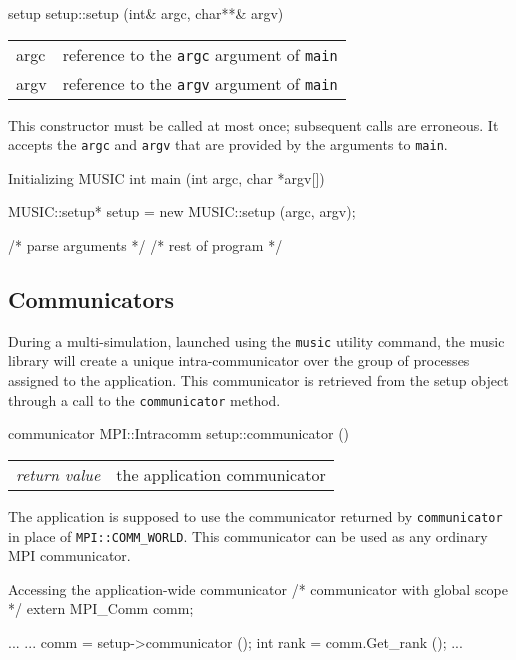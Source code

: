 \documentclass[a4paper]{report}
\begin{document}
\begin{head}{setup}
  setup::setup (int& argc, char**& argv)
\end{head}
\begin{tabular}{ll}
  argc & reference to the \verb|argc| argument of \verb|main| \\
  argv & reference to the \verb|argv| argument of \verb|main| \\
\end{tabular}

This constructor must be called at most once; subsequent calls are
erroneous.  It accepts the \verb|argc| and \verb|argv| that are
provided by the arguments to \verb|main|.

\begin{code}{Initializing MUSIC}
int main (int argc, char *argv[])
{
  MUSIC::setup* setup = new MUSIC::setup (argc, argv);

  /* parse arguments */
  /* rest of program */
}
\end{code}

\subsection{Communicators}

During a multi-simulation, launched using the \verb|music| utility
command, the music library will create a unique intra-communicator
over the group of processes assigned to the application.  This
communicator is retrieved from the setup object through a call to the
\verb|communicator| method.

\begin{head}{communicator}
  MPI::Intracomm setup::communicator ()
\end{head}
\begin{tabular}{ll}
  \emph{return value} & the application communicator \\
\end{tabular}

The application is supposed to use the communicator returned by
\verb|communicator| in place of \verb|MPI::COMM_WORLD|.  This
communicator can be used as any ordinary MPI communicator.

\begin{code}{Accessing the application-wide communicator}
/* communicator with global scope */
extern MPI_Comm comm;

...
{
  ...
  comm = setup->communicator ();
  int rank = comm.Get_rank ();
  ...
}
\end{code}
\end{document}
